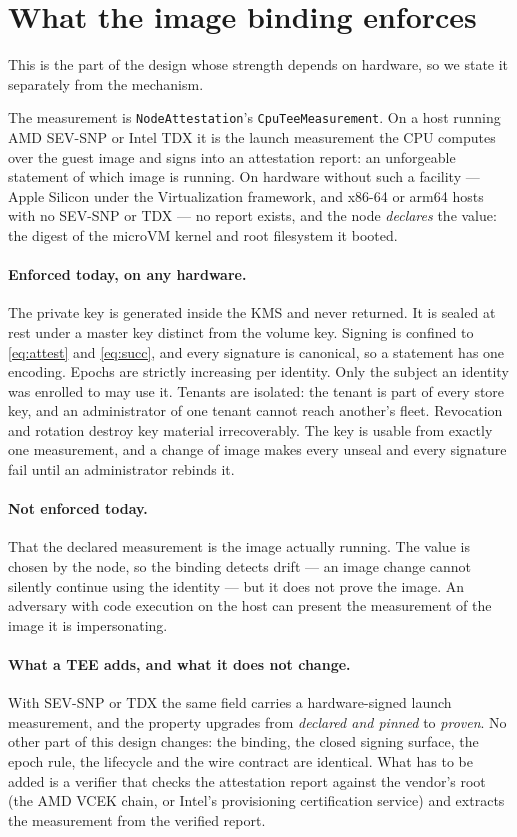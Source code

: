 \documentclass[11pt,a4paper]{article}
\newcommand{\code}[1]{\texttt{#1}}
\begin{document}
\section{What the image binding enforces}

This is the part of the design whose strength depends on hardware, so we state
it separately from the mechanism.

The measurement is \code{NodeAttestation}'s \code{CpuTeeMeasurement}. On a host
running AMD SEV-SNP or Intel TDX it is the launch measurement the CPU computes
over the guest image and signs into an attestation report: an unforgeable
statement of which image is running. On hardware without such a facility ---
Apple Silicon under the Virtualization framework, and x86-64 or arm64 hosts with
no SEV-SNP or TDX --- no report exists, and the node \emph{declares} the value:
the digest of the microVM kernel and root filesystem it booted.

\paragraph{Enforced today, on any hardware.} The private key is generated inside
the KMS and never returned. It is sealed at rest under a master key distinct
from the volume key. Signing is confined to \eqref{eq:attest} and
\eqref{eq:succ}, and every signature is canonical, so a statement has one
encoding. Epochs are strictly increasing per identity. Only the subject
an identity was enrolled to may use it. Tenants are isolated: the tenant is part
of every store key, and an administrator of one tenant cannot reach another's
fleet. Revocation and rotation destroy key
material irrecoverably. The key is usable from exactly one measurement, and a
change of image makes every unseal and every signature fail until an
administrator rebinds it.

\paragraph{Not enforced today.} That the declared measurement is the image
actually running. The value is chosen by the node, so the binding detects drift
--- an image change cannot silently continue using the identity --- but it does
not prove the image. An adversary with code execution on the host can present
the measurement of the image it is impersonating.

\paragraph{What a TEE adds, and what it does not change.} With SEV-SNP or TDX the
same field carries a hardware-signed launch measurement, and the property
upgrades from \emph{declared and pinned} to \emph{proven}. No other part of this
design changes: the binding, the closed signing surface, the epoch rule, the
lifecycle and the wire contract are identical. What has to be added is a
verifier that checks the attestation report against the vendor's root (the
AMD VCEK chain, or Intel's provisioning certification service) and extracts the
measurement from the verified report.
\end{document}
